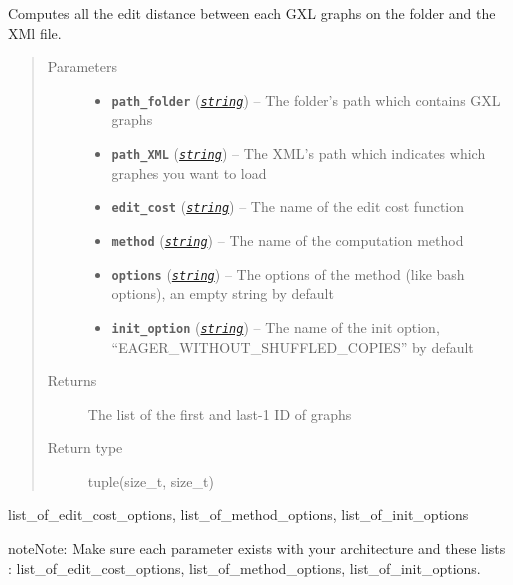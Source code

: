 \documentclass[letterpaper,10pt,english]{sphinxmanual}
\begin{document}
\begin{fulllineitems}
\label{doc:gedlibpy.compute_edit_distance_on_GXl_graphs}
Computes all the edit distance between each GXL graphs on the folder and the XMl file.
\begin{quote}\begin{description}
\item[{Parameters}] \leavevmode\begin{itemize}
\item {} 
\textbf{\texttt{path\_folder}} (\href{https://docs.python.org/3/library/string.html\#module-string}{\emph{\texttt{string}}}) -- The folder's path which contains GXL graphs

\item {} 
\textbf{\texttt{path\_XML}} (\href{https://docs.python.org/3/library/string.html\#module-string}{\emph{\texttt{string}}}) -- The XML's path which indicates which graphes you want to load

\item {} 
\textbf{\texttt{edit\_cost}} (\href{https://docs.python.org/3/library/string.html\#module-string}{\emph{\texttt{string}}}) -- The name of the edit cost function

\item {} 
\textbf{\texttt{method}} (\href{https://docs.python.org/3/library/string.html\#module-string}{\emph{\texttt{string}}}) -- The name of the computation method

\item {} 
\textbf{\texttt{options}} (\href{https://docs.python.org/3/library/string.html\#module-string}{\emph{\texttt{string}}}) -- The options of the method (like bash options), an empty string by default

\item {} 
\textbf{\texttt{init\_option}} (\href{https://docs.python.org/3/library/string.html\#module-string}{\emph{\texttt{string}}}) -- The name of the init option, ``EAGER\_WITHOUT\_SHUFFLED\_COPIES'' by default

\end{itemize}

\item[{Returns}] \leavevmode
The list of the first and last-1 ID of graphs

\item[{Return type}] \leavevmode
tuple(size\_t, size\_t)

\end{description}\end{quote}




list\_of\_edit\_cost\_options, list\_of\_method\_options, list\_of\_init\_options



\begin{notice}{note}{Note:}
Make sure each parameter exists with your architecture and these lists : list\_of\_edit\_cost\_options, list\_of\_method\_options, list\_of\_init\_options.
\end{notice}

\end{fulllineitems}
\end{document}
